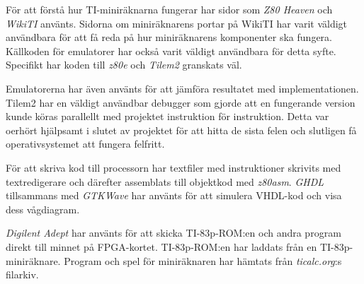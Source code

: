 \documentclass[main.tex]{subfiles}
\begin{document}
För att förstå hur TI-miniräknarna fungerar har sidor som {\it Z80
Heaven}\cite{z80heaven} och {\it WikiTI}\cite{brandonw} använts. Sidorna om
miniräknarens portar på WikiTI har varit väldigt användbara för att få reda på
hur miniräknarens komponenter ska fungera. Källkoden för emulatorer har också
varit väldigt användbara för detta syfte. Specifikt har koden till {\it
z80e}\cite{z80e} och {\it Tilem2}\cite{tilem2} granskats väl.

Emulatorerna har även använts för att jämföra resultatet med implementationen.
Tilem2 har en väldigt användbar debugger som gjorde att en fungerande version
kunde köras parallellt med projektet instruktion för instruktion. Detta var
oerhört hjälpsamt i slutet av projektet för att hitta de sista felen och
slutligen få operativsystemet att fungera felfritt.

För att skriva kod till processorn har textfiler med instruktioner skrivits med
textredigerare och därefter assemblats till objektkod med {\it
z80asm}\cite{z80asm}. {\it GHDL}\cite{ghdl} tillsammans med {\it
GTKWave}\cite{gtkwave} har använts för att simulera VHDL-kod och visa dess
vågdiagram.

{\it Digilent Adept} har använts för att skicka TI-83p-ROM:en och andra program
direkt till minnet på FPGA-kortet. TI-83p-ROM:en har laddats från en
TI-83p-miniräknare. Program och spel för miniräknaren har hämtats från {\it
ticalc.org}:s filarkiv\cite{ticalc}.
\end{document}
